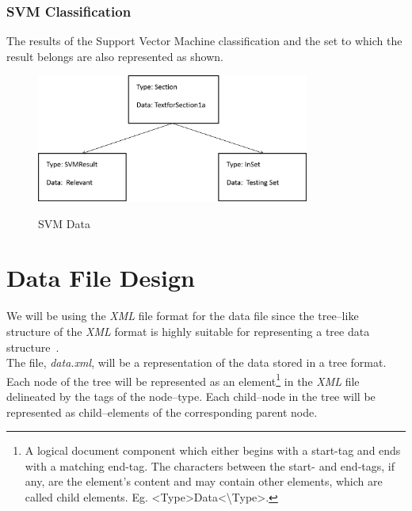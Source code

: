 \documentclass[a4paper,10pt]{report}
\begin{document}
\subsection{SVM Classification}

The results of the Support Vector Machine classification and the set to which the result belongs are also represented as shown. 

\begin{figure}[h!]
\centering
\includegraphics[width=0.80\textwidth]{./diagrams/tree6}\\
\caption{SVM Data}
\end{figure}

\clearpage


\chapter{Data File Design}

We will be using the \emph{XML} file format for the data file since the tree--like structure of the \emph{XML} format is highly suitable for representing a tree data structure~\cite{wikixml}. \\

\noindent The file, \emph{data.xml}, will be a representation of the data stored in a tree format. \\

\noindent Each node of the tree will be represented as an element\footnote{A logical document component which either begins with a start-tag and ends with a matching end-tag. The characters between the start- and end-tags, if any, are the element's content and may contain other elements, which are called child elements. Eg. \textless Type\textgreater Data\textless \textbackslash Type\textgreater.} in the \emph{XML} file delineated by the tags of the node--type. 
Each child--node in the tree will be represented as child--elements of the corresponding parent node. \\
\end{document}
